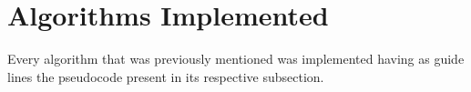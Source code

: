 \chapter{Algorithms Implemented} \label{algorithms-implemented}

Every algorithm that was previously mentioned was implemented having as guide lines the pseudocode present in its respective subsection.
